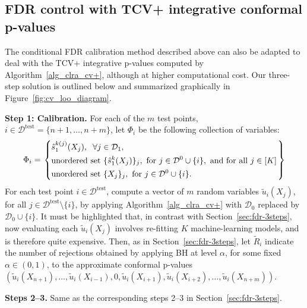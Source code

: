 \documentclass[11pt]{article}
\begin{document}
\subsection{FDR control with TCV+ integrative conformal p-values} \label{sec:fdr-3steps-cv++}

The conditional FDR calibration method described above can also be adapted to deal with the TCV+ integrative p-values computed by Algorithm~\ref{alg_clra_cv+}, although at higher computational cost.
Our three-step solution is outlined below and summarized graphically in Figure~\ref{fig:cv_loo_diagram}.


\textbf{Step 1: Calibration.} For each of the $m$ test points, $i \in \mathcal{D}^{\mathrm{test}} = \{n+1,\ldots,n+m\}$, let $\Phi_i$ be the following collection of variables:
\begin{align}\label{eq:sigma_algebra-cv++}
    \Phi_i=
  \begin{rcases}
    \begin{dcases}
      \hat{s}_1^{k(j)}(X_j), \hspace{0.2cm}  \forall j \in \mathcal{D}_1, \\
      \text{unordered set } \{\hat{s}^{k}_1(X_j)\}_j, \text{ for } j \in \mathcal{D}^0 \cup \{i\}, \text{ and for all } j \in [K] \\
      \text{unordered set } \{X_j\}_j, \text{ for } j \in \mathcal{D}^0 \cup \{i\}.
    \end{dcases}
  \end{rcases}
\end{align}
For each test point $i \in \mathcal{D}^{\mathrm{test}}$, compute a vector of $m$ random variables $\tilde{u}_{i}(X_j)$, for all $j \in \mathcal{D}^{\mathrm{test}} \setminus \{i\}$, by applying Algorithm~\ref{alg_clra_cv+} with $\mathcal{D}_0$ replaced by $\mathcal{D}_0 \cup \{i\}$.
It must be highlighted that, in contrast with Section~\ref{sec:fdr-3steps}, now evaluating each $\tilde{u}_{i}(X_j)$ involves re-fitting $K$ machine-learning models, and is therefore quite expensive.
Then, as in Section~\ref{sec:fdr-3steps}, let $\tilde{R}_i$ indicate the number of rejections obtained by applying BH at level $\alpha$, for some fixed $\alpha \in (0,1)$, to the approximate conformal p-values $(\tilde{u}_i(X_{n+1}), \dots, \tilde{u}_i(X_{i-1}), 0, \tilde{u}_i(X_{i+1}), \tilde{u}_i(X_{i+2}), \dots, \tilde{u}_i(X_{n+m}))$.

\textbf{Steps 2--3.} Same as the corresponding steps 2--3 in Section~\ref{sec:fdr-3steps}.
\end{document}
